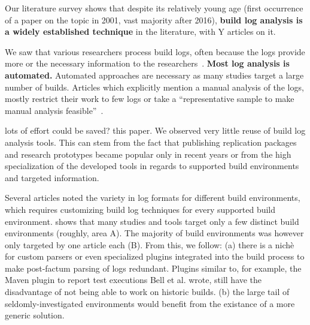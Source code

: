 Our literature survey shows that despite its relatively young age
(first occurrence of a paper on the topic in 2001, vast majority after
2016), \textbf{build log analysis is a widely established technique}
in the literature, with Y articles on it.


We saw that various researchers process build logs, often because the
logs  provide more or the necessary
information to the researchers~\cite{ren2018automated}.
\textbf{Most log analysis is automated.} Automated approaches are
necessary as many studies target a large
number of builds.
Articles
which explicitly mention a manual analysis of the logs, mostly
restrict their work to few logs or take a ``representative sample to
make manual analysis feasible''~\cite{zolfagharinia2017not}.

lots of effort could be saved?
this paper.
We observed very little reuse of build log analysis tools.
This can stem from the fact that publishing replication packages and
research prototypes became popular only in recent years or from the
high specialization of the developed tools in regards to supported
build environments and targeted information.

Several articles noted the variety in log formats for different build
environments, which requires customizing build log techniques for
every supported build environment.
 shows that many studies and tools target
only a few distinct build environments (roughly, area A).
The majority of build environments was however only targeted by one
article each (B).
From this, we follow: (a) there is a nichè for custom parsers or even
specialized plugins integrated into the build process to make post-factum
parsing of logs redundant.
Plugins  similar to, for example, the Maven plugin to report test
executions Bell et al.
wrote, still have the disadvantage of not being able to work on historic
builds.
(b) the large tail of seldomly-investigated environments would benefit
from the existance of a more generic
solution.

